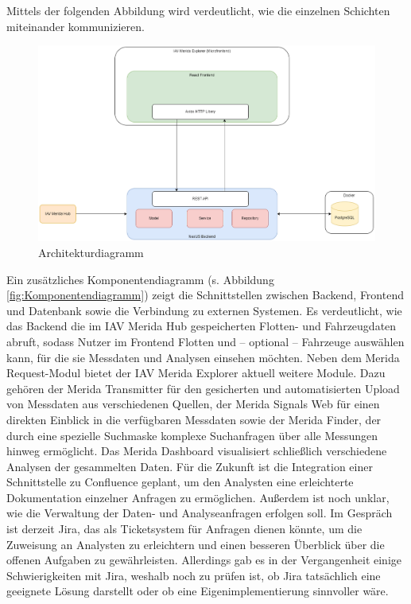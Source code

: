 Mittels der folgenden Abbildung wird verdeutlicht, wie die einzelnen Schichten miteinander kommunizieren.
\begin{figure}[H]
    \centering
    \includegraphics[scale=.4]{media/Architekturdiagramm}
    \caption{Architekturdiagramm}
    \label{fig:Architekturdiagramm}
\end{figure}
Ein zusätzliches Komponentendiagramm (s. Abbildung \ref{fig:Komponentendiagramm}) zeigt die Schnittstellen zwischen Backend, Frontend und Datenbank sowie die Verbindung zu externen Systemen. Es verdeutlicht, wie das Backend die im IAV Merida Hub gespeicherten Flotten- und Fahrzeugdaten abruft, sodass Nutzer im Frontend Flotten und – optional – Fahrzeuge auswählen kann, für die sie Messdaten und Analysen einsehen möchten.
\newline
Neben dem Merida Request-Modul bietet der IAV Merida Explorer aktuell weitere Module. Dazu gehören der Merida Transmitter für den gesicherten und automatisierten Upload von Messdaten aus verschiedenen Quellen, der Merida Signals Web für einen direkten Einblick in die verfügbaren Messdaten sowie der Merida Finder, der durch eine spezielle Suchmaske komplexe Suchanfragen über alle Messungen hinweg ermöglicht. Das Merida Dashboard visualisiert schließlich verschiedene Analysen der gesammelten Daten.
\newline
Für die Zukunft ist die Integration einer Schnittstelle zu Confluence geplant, um den Analysten eine erleichterte Dokumentation einzelner Anfragen zu ermöglichen.
\newline
Außerdem ist noch unklar, wie die Verwaltung der Daten- und Analyseanfragen erfolgen soll. Im Gespräch ist derzeit Jira, das als Ticketsystem für Anfragen dienen könnte, um die Zuweisung an Analysten zu erleichtern und einen besseren Überblick über die offenen Aufgaben zu gewährleisten. Allerdings gab es in der Vergangenheit einige Schwierigkeiten mit Jira, weshalb noch zu prüfen ist, ob Jira tatsächlich eine geeignete Lösung darstellt oder ob eine Eigenimplementierung sinnvoller wäre.
